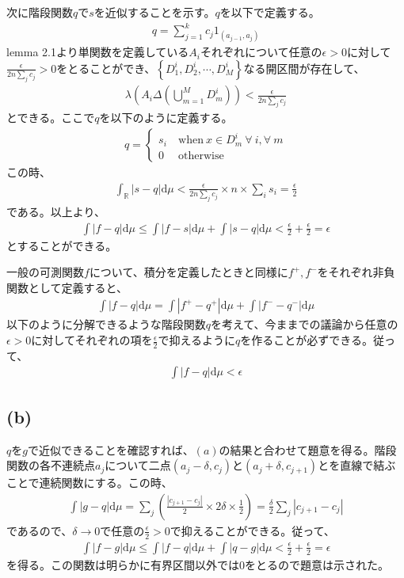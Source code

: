 \documentclass{article}
\begin{document}
次に階段関数$q$で$s$を近似することを示す。$q$を以下で定義する。
\begin{align*}
	q = \sum_{j = 1}^k c_j 1_{(a_{j-1}, a_j)}
\end{align*}
lemma 2.1より単関数を定義している$A_i$それぞれについて任意の$\epsilon > 0$に対して$\frac{\epsilon}{2n\sum_j c_j} > 0$をとることができ、$\left\{ D_1^i, D_2^i, \cdots, D_M^i \right\}$なる開区間が存在して、
\begin{align*}
	\lambda\left( A_i \Delta \left( \bigcup_{m = 1}^M D_m^i \right) \right) < \frac{\epsilon}{2n\sum_j c_j} 
\end{align*}
とできる。ここで$q$を以下のように定義する。
\begin{align*}
	q = \begin{cases}
	s_i \ &\text{when}\ x \in D_m^i\ \forall\ i,\forall\ m\\
	0\ &\text{otherwise}
	\end{cases}
\end{align*}
この時、
\begin{align*}
	\int_{\mathbb{R}} \left| s - q \right| \mathrm{d}\mu < \frac{\epsilon}{2n\sum_j c_j} \times n \times \sum_i s_i = \frac{\epsilon}{2}
\end{align*}
である。以上より、
\begin{align*}
	\int |f-q|\mathrm{d}\mu \leq \int |f-s| \mathrm{d}\mu + \int |s-q | \mathrm{d}\mu < \frac{\epsilon}{2} + \frac{\epsilon}{2} = \epsilon
\end{align*}
とすることができる。

一般の可測関数$f$について、積分を定義したときと同様に$f^{+}, f^{-}$をそれぞれ非負関数として定義すると、
\begin{align*}
	\int |f-q|\mathrm{d}\mu = \int |f^{+} - q^{+}| \mathrm{d}\mu + \int |f^{-} - q^{-}| \mathrm{d}\mu
\end{align*}
以下のように分解できるような階段関数$q$を考えて、今ままでの議論から任意の$\epsilon > 0$に対してそれぞれの項を$\frac{\epsilon}{2}$で抑えるように$q$を作ることが必ずできる。従って、
\begin{align*}
	\int |f-q|\mathrm{d}\mu < \epsilon
\end{align*}

\subsection{(b)}
$q$を$g$で近似できることを確認すれば、$(a)$の結果と合わせて題意を得る。階段関数の各不連続点$a_j$について二点$(a_j-\delta, c_j)$と$(a_j + \delta, c_{j+1})$とを直線で結ぶことで連続関数にする。この時、
\begin{align*}
	\int |g -q|\mathrm{d}\mu = \sum_j \left( \frac{|c_{j+1} - c_j|}{2} \times 2\delta \times \frac{1}{2} \right) = \frac{\delta}{2} \sum_j | c_{j+1} - c_j |
\end{align*}
であるので、$\delta \to 0$で任意の$\frac{\epsilon}{2} > 0$で抑えることができる。従って、
\begin{align*}
	\int |f-g|\mathrm{d}\mu \leq \int |f-q| \mathrm{d}\mu + \int |q-g | \mathrm{d}\mu < \frac{\epsilon}{2} + \frac{\epsilon}{2} = \epsilon
\end{align*}
を得る。この関数は明らかに有界区間以外では$0$をとるので題意は示された。
\end{document}
